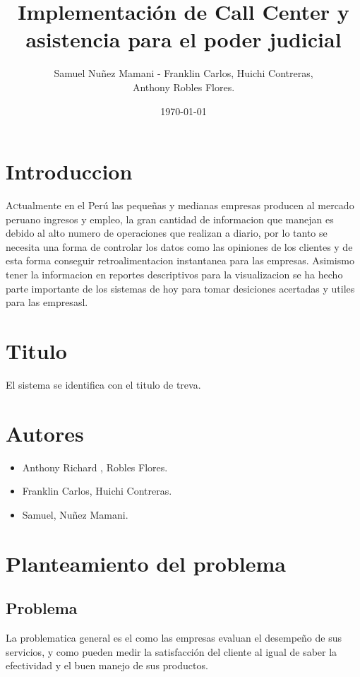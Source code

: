 \documentclass[twoside,twocolumn]{article}
\title{Implementación de Call Center y asistencia para el poder judicial}
\author{Samuel Nuñez Mamani - Franklin Carlos, Huichi Contreras, \\
Anthony Robles Flores. }
\date{\today}
\begin{document}
\maketitle


\section{Introduccion}
\lettrine[nindent=0em,lines=3]{A}ctualmente en el Perú las pequeñas y medianas empresas producen al mercado peruano ingresos y empleo, la gran cantidad de informacion que manejan es debido al alto numero de operaciones que realizan a diario, por lo tanto se necesita una forma de controlar los datos como las opiniones de los clientes y de esta forma conseguir retroalimentacion instantanea para las empresas. Asimismo tener la informacion en reportes descriptivos para la visualizacion se ha hecho parte importante de los sistemas de hoy para tomar desiciones acertadas y utiles para las empresasl.

\section{Titulo}
El sistema se identifica con el titulo de treva.

\section{Autores}
\begin{itemize}
\item Anthony Richard , Robles Flores.
\item Franklin Carlos, Huichi Contreras.
\item Samuel, Nuñez Mamani.
\end{itemize}

\section{Planteamiento del problema}
\subsection{Problema}
La problematica general es el como las empresas evaluan el desempeño de sus servicios, y como pueden medir la satisfacción del cliente al igual de saber la efectividad y el buen manejo de sus productos.
\end{document}
